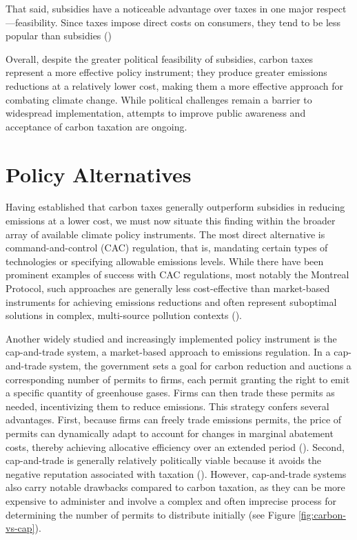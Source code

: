 \documentclass[12pt, a4paper, twoside]{article}
\begin{document}
That said, subsidies have a noticeable advantage over taxes in one major respect—feasibility. Since taxes impose direct costs on consumers, they tend to be less popular than subsidies (\cites{bernton2018washington}{jabakhanji2024federal}{rubin2018yellow}{taylor2014australia})

Overall, despite the greater political feasibility of subsidies, carbon taxes represent a more effective policy instrument; they produce greater emissions reductions at a relatively lower cost, making them a more effective approach for combating climate change. While political challenges remain a barrier to widespread implementation, attempts to improve public awareness and acceptance of carbon taxation are ongoing. 

\section{Policy Alternatives}

Having established that carbon taxes generally outperform subsidies in reducing emissions at a lower cost, we must now situate this finding within the broader array of available climate policy instruments. The most direct alternative is command-and-control (CAC) regulation, that is, mandating certain types of technologies or specifying allowable emissions levels. While there have been prominent examples of success with CAC regulations, most notably the Montreal Protocol, such approaches are generally less cost-effective than market-based instruments for achieving emissions reductions and often represent suboptimal solutions in complex, multi-source pollution contexts (\cite[p.\ 154]{aldy2012promise}). 

Another widely studied and increasingly implemented policy instrument is the cap-and-trade system, a market-based approach to emissions regulation. In a cap-and-trade system, the government sets a goal for carbon reduction and auctions a corresponding number of permits to firms, each permit granting the right to emit a specific quantity of greenhouse gases. Firms can then trade these permits as needed, incentivizing them to reduce emissions. This strategy confers several advantages. First, because firms can freely trade emissions permits, the price of permits can dynamically adapt to account for changes in marginal abatement costs, thereby achieving allocative efficiency over an extended period (\cite[pp.\ 157–58]{aldy2012promise}). Second, cap-and-trade is generally relatively politically viable because it avoids the negative reputation associated with taxation (\cite{frank2014pricing}). However, cap-and-trade systems also carry notable drawbacks compared to carbon taxation, as they can be more expensive to administer and involve a complex and often imprecise process for determining the number of permits to distribute initially (see Figure \ref{fig:carbon-vs-cap}). 
\end{document}
